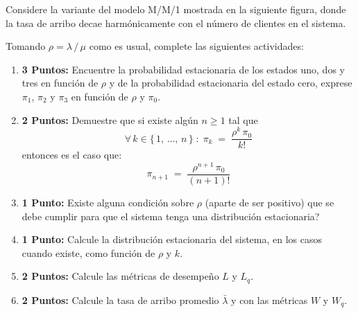 \documentclass[ a4paper, twoside, 11pt]{article}
\begin{document}
\begin{problem}
\label{prob:arribo-harmonico}
Considere la variante del modelo M/M/1 mostrada en la siguiente figura, donde la tasa de arribo decae harm\'onicamente con el n\'umero de clientes en el sistema. 

\begin{figure}[htb]
\centering
\def\svgwidth{0.9\columnwidth}

\end{figure}
\halfskip

Tomando $\rho = \lambda \, / \, \mu$ como es usual, complete las siguientes actividades: 
\begin{enumerate}[label=\textbf{\alph*)}]
\item \textbf{3 Puntos:} Encuentre la probabilidad estacionaria de los estados uno, dos y tres en funci\'on de $\rho$ y de la probabilidad estacionaria del estado cero, \ie exprese $\pi_1$, $\pi_2$ y $\pi_3$ en funci\'on de $\rho$ y $\pi_0$. 
\item \textbf{2 Puntos:} Demuestre que si existe alg\'un $n \geq 1$ tal que
\[
\forall \, k \in \{ \, 1, \, \dots, \, n \, \} \; \colon \;
\pi_k \; = \; \frac{ \rho^k \, \pi_0 }{k!}
\]
entonces es el caso que: 
\[
\pi_{n+1} \; = \; \frac{ \rho^{n+1} \, \pi_0 }{(n+1)!}
\]
\item \textbf{1 Punto:} Existe alguna condici\'on sobre $\rho$ (aparte de ser positivo) que se debe cumplir para que el sistema tenga una distribuci\'on estacionaria? 
\item \textbf{1 Punto:} Calcule la distribuci\'on estacionaria del sistema, en los casos cuando existe, como funci\'on de $\rho$ y $k$. 
\item \textbf{2 Puntos:} Calcule las m\'etricas de desempe\~no $L$ y $L_q$. 
\item \textbf{2 Puntos:} Calcule la tasa de arribo promedio $\bar{\lambda}$ y con las m\'etricas $W$ y $W_q$. 
\end{enumerate}

\end{problem}
\fullskip
\end{document}
